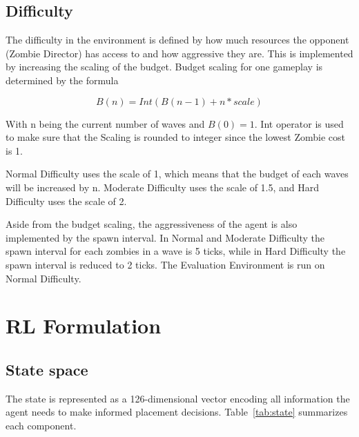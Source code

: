 \documentclass[conference,onecolumn]{IEEEtran}
\begin{document}
\subsection{Difficulty}

The difficulty in the environment is defined by how much resources the opponent (Zombie Director) has access to and how aggressive they are. This is implemented by increasing the scaling of the budget. Budget scaling for one gameplay is determined by the formula

$$B(n) = Int(B(n-1) + n * scale) $$

With n being the current number of waves and $B(0) = 1$. Int operator is used to make sure that the Scaling is rounded to integer since the lowest Zombie cost is 1.

Normal Difficulty uses the scale of 1, which means that the budget of each waves will be increased by n. Moderate Difficulty uses the scale of 1.5, and Hard Difficulty uses the scale of 2.

Aside from the budget scaling, the aggressiveness of the agent is also implemented by the spawn interval. In Normal and Moderate Difficulty the spawn interval for each zombies in a wave is 5 ticks, while in Hard Difficulty the spawn interval is reduced to 2 ticks. The Evaluation Environment is run on Normal Difficulty.

\section{RL Formulation}
\label{sec:rl_formulation}
\subsection{State space}
The state is represented as a 126-dimensional vector encoding all information the agent needs to make informed placement decisions. Table~\ref{tab:state} summarizes each component.
\end{document}
